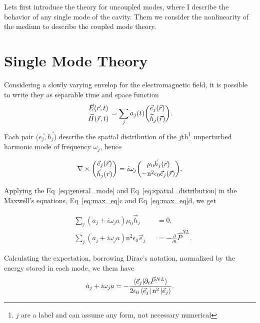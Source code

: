 Lets first introduce the theory for uncoupled modes, where I describe the behavior of any single mode of the cavity. Them we consider the nonlinearity of the medium to describe the coupled mode theory. 

\section{Single Mode Theory}

Considering a slowly varying envelop for the electromagnetic field, it is possible to write they as separable time and space function
\begin{equation}
    \genfrac{}{}{0 pt}{}{\vec{E}(\vec{r},t)}{\vec{H}(\vec{r},t)} = \sum_j a_j(t)\genfrac{(}{)}{0 pt}{}{\vec{e}_j(\vec{r})}{\vec{h}_j(\vec{r})}.
    \label{eq:general_mode}
\end{equation}
Each pair ($\vec{e_j},\vec{h_j}$) describe the spatial distribution of the $j$th\footnote{$j$ are a label and can assume any form, not necessary numerical} unperturbed harmonic mode of frequency $\omega_j$, hence 

\begin{equation}
    \nabla \times \genfrac{(}{)}{0 pt}{}{\vec{e}_j(\vec{r})}{\vec{h}_j(\vec{r})} = i\omega_j \genfrac{(}{)}{0 pt}{}{\mu_0\vec{h}_j(\vec{r})}{-\n^2\epsilon_0\vec{e}_j(\vec{r})}.
    \label{eq:spatial_distribution}
\end{equation}

Applying the Eq~\ref{eq:general_mode} and Eq~\ref{eq:spatial_distribution} in the Maxwell's equations, Eq~\ref{eq:max_eq}c and Eq~\ref{eq:max_eq}d, we get

\begin{subequations}
    \begin{alignat}{2}
        &\sum_j \left(\dot{a}_j + i \omega_j a\right) \mu_0 \vec{h}_j &&= 0,\\
        &\sum_j \left(\dot{a}_j + i \omega_j a\right) \text{n}^2\epsilon_0 \vec{e}_j &&= -\frac{\partial}{\partial t}\vec{P}^{NL}.
    \end{alignat}
\end{subequations}

Calculating the expectation, borrowing Dirac's notation, normalized by the energy stored in each mode, we them have 
\begin{equation}
    \dot{a}_j + i \omega_j a = -\frac{\braket{\vec{e}_j|\partial_t\vec{P}^{NL}}}{2\epsilon_0\bra{\vec{e}_j}\text{n}^2\ket{\vec{e}_j}}.
    \label{eq:rate_equation_1}
\end{equation}

